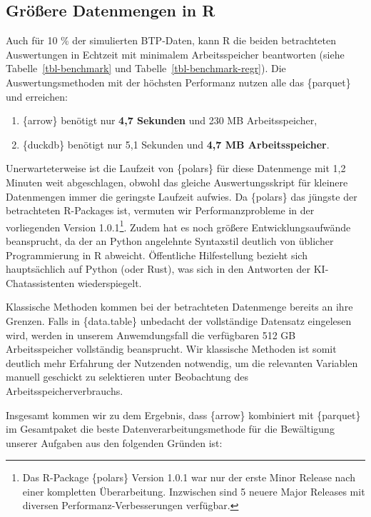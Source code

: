 \documentclass[
  german,
  10pt,
  twoside]{article}
\providecommand{\tightlist}{%
  \setlength{\itemsep}{0pt}\setlength{\parskip}{0pt}}
\let\oldref\ref
\renewcommand{\ref}[1]{\oldref{#1}\raisebox{-0.2ex}{\scriptsize\color{wistaBlue}\ding{247}}}
\begin{document}
\clearpage

\subsection{Größere Datenmengen in
R}\label{gruxf6uxdfere-datenmengen-in-r}

Auch für 10 \% der simulierten BTP-Daten, kann R die beiden betrachteten
Auswertungen in Echtzeit mit minimalem Arbeitsspeicher beantworten
(siehe Tabelle~\ref{tbl-benchmark} und
Tabelle~\ref{tbl-benchmark-regr}). Die Auswertungsmethoden mit der
höchsten Performanz nutzen alle das \{parquet\} und erreichen:

\begin{enumerate}
\def\labelenumi{\arabic{enumi}.}
\tightlist
\item
  \{arrow\} benötigt nur \textbf{4,7 Sekunden} und 230 MB
  Arbeitsspeicher,
\item
  \{duckdb\} benötigt nur 5,1 Sekunden und \textbf{4,7 MB
  Arbeitsspeicher}.
\end{enumerate}

Unerwarteterweise ist die Laufzeit von \{polars\} für diese Datenmenge
mit 1,2 Minuten weit abgeschlagen, obwohl das gleiche Auswertungsskript
für kleinere Datenmengen immer die geringste Laufzeit aufwies. Da
\{polars\} das jüngste der betrachteten R-Packages ist, vermuten wir
Performanzprobleme in der vorliegenden Version 1.0.1\footnote{Das
  R-Package \{polars\} Version 1.0.1 war nur der erste Minor Release
  nach einer kompletten Überarbeitung. Inzwischen sind 5 neuere Major
  Releases mit diversen Performanz-Verbesserungen verfügbar.}. Zudem hat
es noch größere Entwicklungsaufwände beansprucht, da der an Python
angelehnte Syntaxstil deutlich von üblicher Programmierung in R
abweicht. Öffentliche Hilfestellung bezieht sich hauptsächlich auf
Python (oder Rust), was sich in den Antworten der KI-Chatassistenten
wiederspiegelt.

Klassische Methoden kommen bei der betrachteten Datenmenge bereits an
ihre Grenzen. Falls in \{data.table\} unbedacht der vollständige
Datensatz eingelesen wird, werden in unserem Anwemdungsfall die
verfügbaren 512 GB Arbeitsspeicher vollständig beansprucht. Wir
klassische Methoden ist somit deutlich mehr Erfahrung der Nutzenden
notwendig, um die relevanten Variablen manuell geschickt zu selektieren
unter Beobachtung des Arbeitsspeicherverbrauchs.

Insgesamt kommen wir zu dem Ergebnis, dass \{arrow\} kombiniert mit
\{parquet\} im Gesamtpaket die beste Datenverarbeitungsmethode für die
Bewältigung unserer Aufgaben aus den folgenden Gründen ist:
\end{document}
